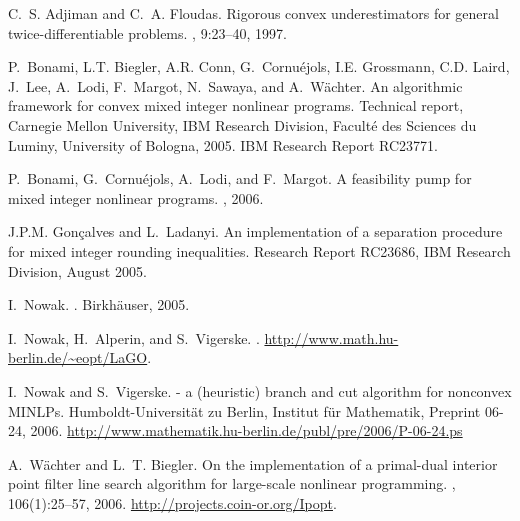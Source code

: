 \documentclass[11pt]{article}
\begin{document}

\begin{thebibliography}{1}

C.~S. Adjiman and C.~A. Floudas.
\newblock Rigorous convex underestimators for general twice-differentiable
  problems.
, 9:23--40, 1997.

P.~Bonami, L.T. Biegler, A.R. Conn, G.~Cornu\'ejols, I.E. Grossmann, C.D.
  Laird, J.~Lee, A.~Lodi, F.~Margot, N.~Sawaya, and A.~W\"achter.
\newblock An algorithmic framework for convex mixed integer nonlinear programs.
\newblock Technical report, Carnegie Mellon University, IBM Research Division,
  Facult\'e des Sciences du Luminy, University of Bologna, 2005.
\newblock IBM Research Report RC23771.

P.~Bonami, G.~Cornu\'ejols, A.~Lodi, and F.~Margot.
\newblock A feasibility pump for mixed integer nonlinear programs.
, 2006.

J.P.M. Gon\c{c}alves and L.~Ladanyi.
\newblock An implementation of a separation procedure for mixed integer
  rounding inequalities.
\newblock Research Report RC23686, IBM Research Division, August 2005.

I.~Nowak.
.
\newblock Birkh\"auser, 2005.

I.~Nowak, H.~Alperin, and S.~Vigerske.
.
\newblock \url{http://www.math.hu-berlin.de/~eopt/LaGO}.

I.~Nowak and S.~Vigerske.
 - a (heuristic) branch and cut algorithm for nonconvex
  {MINLPs}.
\newblock Humboldt-Universit\"at zu Berlin, Institut f\"ur Mathematik, Preprint
  06-24, 2006.
\newblock \url{http://www.mathematik.hu-berlin.de/publ/pre/2006/P-06-24.ps}

A.~W\"achter and L.~T. Biegler.
\newblock On the implementation of a primal-dual interior point filter line
  search algorithm for large-scale nonlinear programming.
, 106(1):25--57, 2006.
\newblock \url{http://projects.coin-or.org/Ipopt}.

\end{thebibliography}
\end{document}
